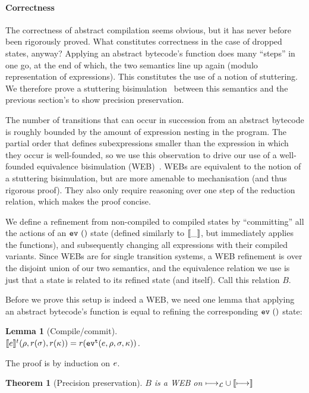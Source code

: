 \documentclass[preprint,onecolumn,9pt]{sigplanconf} %
\newtheorem{theorem}{Theorem}
\newtheorem{lemma}{Lemma}
\begin{document}
\paragraph{Correctness}
The correctness of abstract compilation seems obvious, but it has
never before been rigorously proved. What constitutes correctness in
the case of dropped states, anyway? Applying an abstract bytecode's
function does many ``steps'' in one go, at the end of which, the two
semantics line up again (modulo representation of expressions). This
constitutes the use of a notion of stuttering. We therefore prove a
stuttering bisimulation~\cite{ianjohnson:BCG88} between this
semantics and the previous section's to show precision preservation.

The number of transitions that can occur in succession from an
abstract bytecode is roughly bounded by the amount of expression
nesting in the program. The partial order that defines subexpressions
smaller than the expression in which they occur is well-founded, so we
use this observation to drive our use of a well-founded equivalence
bisimulation (WEB)~\cite{ianjohnson:manolios-diss}. WEBs are equivalent to the notion of a stuttering
bisimulation, but are more amenable to mechanisation (and thus
rigorous proof). They also only require reasoning over one step of the
reduction relation, which makes the proof concise.

We define a refinement from non-compiled to compiled states by
``committing'' all the actions of an $\ev{}$ state (defined similarly to
$\compile{\_}$, but immediately applies the functions), and
subsequently changing all expressions with their compiled
variants. Since WEBs are for single transition systems, a WEB
refinement is over the disjoint union of our two semantics, and the
equivalence relation we use is just that a state is related to its
refined state (and itself). Call this relation $B$.

Before we prove this setup is indeed a WEB, we need one lemma that
applying an abstract bytecode's function is equal to refining the
corresponding $\ev{}$ state:
%
\begin{lemma}[Compile/commit]\hfill\\
$\compile{\mexp}^\mcntr(\menv,r(\msto),r(\mkont)) = r(\ev[^\mcntr]{\mexp,\menv,\msto,\mkont})$.
\end{lemma}
The proof is by induction on $\mexp$.

\begin{theorem}[Precision preservation]
$B$ is a WEB on $\lmachstep \cup \cmachstep$
\end{theorem}
\end{document}
